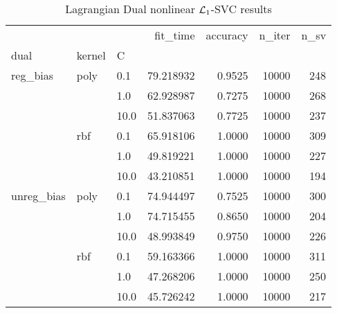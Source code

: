 \begin{table}[H]
\centering
\caption{Lagrangian Dual nonlinear $\protect \mathcal{L}_1$-SVC results}
\label{nonlinear_lagrangian_dual_l1_svc_cv_results}
\begin{tabular}{lllrrrr}
\toprule
           &     &      &   fit\_time &  accuracy &  n\_iter &  n\_sv \\
dual & kernel & C &            &           &         &       \\
\midrule
reg\_bias & poly & 0.1  &  79.218932 &    0.9525 &   10000 &   248 \\
           &     & 1.0  &  62.928987 &    0.7275 &   10000 &   268 \\
           &     & 10.0 &  51.837063 &    0.7725 &   10000 &   237 \\
           & rbf & 0.1  &  65.918106 &    1.0000 &   10000 &   309 \\
           &     & 1.0  &  49.819221 &    1.0000 &   10000 &   227 \\
           &     & 10.0 &  43.210851 &    1.0000 &   10000 &   194 \\
unreg\_bias & poly & 0.1  &  74.944497 &    0.7525 &   10000 &   300 \\
           &     & 1.0  &  74.715455 &    0.8650 &   10000 &   204 \\
           &     & 10.0 &  48.993849 &    0.9750 &   10000 &   226 \\
           & rbf & 0.1  &  59.163366 &    1.0000 &   10000 &   311 \\
           &     & 1.0  &  47.268206 &    1.0000 &   10000 &   250 \\
           &     & 10.0 &  45.726242 &    1.0000 &   10000 &   217 \\
\bottomrule
\end{tabular}
\end{table}

